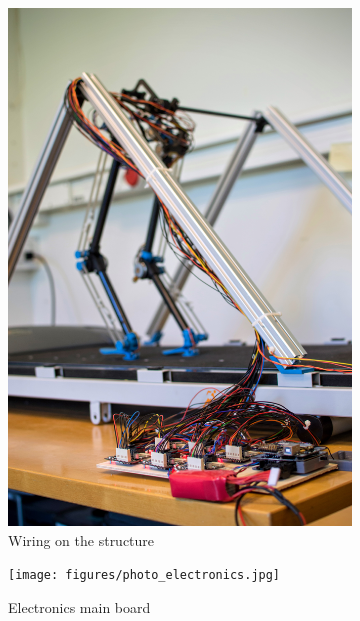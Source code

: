 \begin{figure}[ht]
\centering
  \begin{subfigure}[b]{0.4\textwidth}
    \includegraphics[width=\textwidth]{figures/photo_electronics_2.jpg}
    \caption{Wiring on the structure}
    \label{fig:electronics1}
  \end{subfigure}
  \begin{subfigure}[b]{0.4\textwidth}
    \texttt{[image: figures/photo\_electronics.jpg]}
    \caption{Electronics main board}
    \label{fig:electronics2}
  \end{subfigure}
  \begin{subfigure}[b]{0.4\textwidth}

\end{subfigure}
\end{figure}
